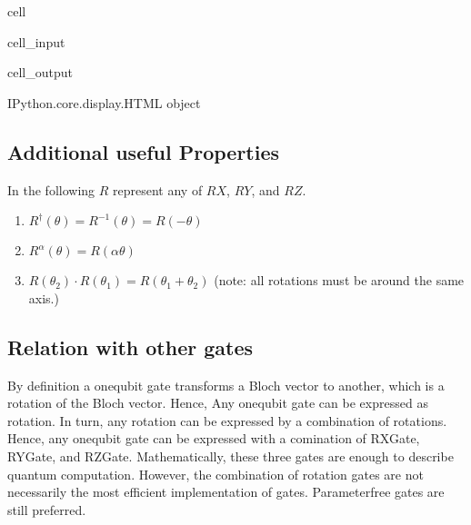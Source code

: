 \documentclass[letterpaper,10pt,english]{jupyterBook}
\begin{document}
\begin{sphinxuseclass}{cell}\begin{sphinxVerbatimInput}

\begin{sphinxuseclass}{cell_input}
\begin{sphinxVerbatim}[commandchars=\\\{\}]
\end{sphinxVerbatim}

\end{sphinxuseclass}\end{sphinxVerbatimInput}
\begin{sphinxVerbatimOutput}

\begin{sphinxuseclass}{cell_output}
\begin{sphinxVerbatim}[commandchars=\\\{\}]
\PYGZlt{}IPython.core.display.HTML object\PYGZgt{}
\end{sphinxVerbatim}

\end{sphinxuseclass}\end{sphinxVerbatimOutput}

\end{sphinxuseclass}

\subsection{Additional useful Properties}
\label{\detokenize{q1gates/r:additional-useful-properties}}
\sphinxAtStartPar
In the following \(R\) represent any of \(RX\), \(RY\), and \(RZ\).
\begin{enumerate}
%
\item {}
\sphinxAtStartPar
\(R^\dagger(\theta) = R^{-1}(\theta) = R(-\theta)\)

\item {}
\sphinxAtStartPar
\(R^{\alpha} (\theta) = R(\alpha\theta)\)

\item {}
\sphinxAtStartPar
\(R(\theta_2) \cdot R(\theta_1) = R(\theta_1 + \theta_2)\)  (note: all rotations must be around the same axis.)

\end{enumerate}


\subsection{Relation with other gates}
\label{\detokenize{q1gates/r:relation-with-other-gates}}
\sphinxAtStartPar
By definition a one\sphinxhyphen{}qubit gate transforms a Bloch vector to another, which is a rotation of the Bloch vector.  Hence, Any one\sphinxhyphen{}qubit gate can be expressed as rotation.  In turn, any rotation can be expressed by a combination of rotations.  Hence, any one\sphinxhyphen{}qubit gate can be expressed with a comination of RXGate, RYGate, and RZGate.  Mathematically, these three gates are enough to describe quantum computation.  However, the combination of rotation gates are not necessarily the most efficient implementation of gates.  Parameter\sphinxhyphen{}free gates are still preferred.
\end{document}

